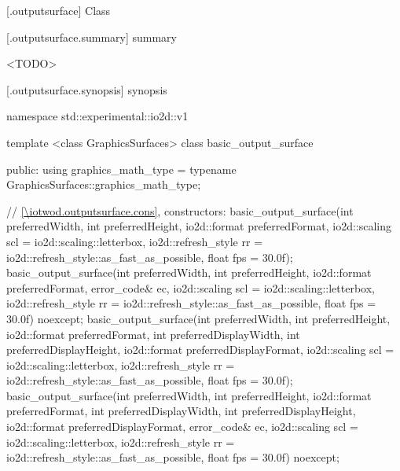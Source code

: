  [\iotwod.outputsurface] {Class }

 [\iotwod.outputsurface.summary] { summary}

\pnum
{}%
<TODO>

 [\iotwod.outputsurface.synopsis] { synopsis}

\begin{codeblock}
namespace std::experimental::io2d::v1 {
  template <class GraphicsSurfaces>
  class basic_output_surface {
  public:
    using graphics_math_type = typename GraphicsSurfaces::graphics_math_type;

    // \ref{\iotwod.outputsurface.cons}, constructors:
    basic_output_surface(int preferredWidth, int preferredHeight,
      io2d::format preferredFormat,
      io2d::scaling scl = io2d::scaling::letterbox,
      io2d::refresh_style rr = io2d::refresh_style::as_fast_as_possible,
      float fps = 30.0f);
    basic_output_surface(int preferredWidth, int preferredHeight,
      io2d::format preferredFormat,
      error_code& ec, io2d::scaling scl = io2d::scaling::letterbox,
      io2d::refresh_style rr = io2d::refresh_style::as_fast_as_possible,
      float fps = 30.0f) noexcept;
    basic_output_surface(int preferredWidth, int preferredHeight,
      io2d::format preferredFormat, int preferredDisplayWidth,
      int preferredDisplayHeight, io2d::format preferredDisplayFormat,
      io2d::scaling scl = io2d::scaling::letterbox,
      io2d::refresh_style rr = io2d::refresh_style::as_fast_as_possible,
      float fps = 30.0f);
    basic_output_surface(int preferredWidth, int preferredHeight,
      io2d::format preferredFormat, int preferredDisplayWidth,
      int preferredDisplayHeight, io2d::format preferredDisplayFormat,
      error_code& ec, io2d::scaling scl = io2d::scaling::letterbox,
      io2d::refresh_style rr = io2d::refresh_style::as_fast_as_possible,
      float fps = 30.0f) noexcept;

}}
\end{codeblock}
